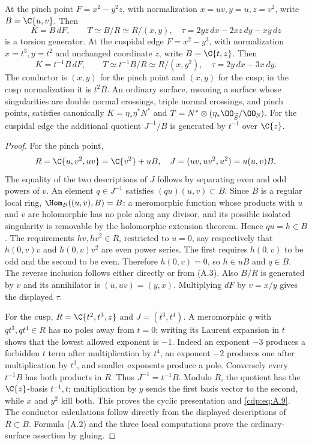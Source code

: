 
\begin{proposition}\label{cdp:st:A.2.4}
At the pinch point $F=x^2-y^2z$, with normalization $x=uv,y=u,z=v^2$, write $B=\C\{u,v\}$. Then
\[
 K=B\,dF,\qquad T\simeq B/R\simeq R/(x,y),
\quad \tau=2yz\,dx-2xz\,dy-xy\,dz
\tag{A.8}\label{cdp:eq:A.8}
\]
is a torsion generator. At the cuspidal edge $F=x^2-y^3$, with normalization $x=t^3,y=t^2$ and unchanged coordinate $z$, write $B=\C\{t,z\}$. Then
\[
 K=t^{-1}B\,dF,\qquad
 T\simeq t^{-1}B/R\simeq R/(x,y^2),
 \quad\tau=2y\,dx-3x\,dy.
\tag{A.9}\label{cdp:eq:A.9}
\]
The conductor is $(x,y)$ for the pinch point and $(x,y)$ for the cusp; in the cusp normalization it is $t^2B$. An ordinary surface, meaning a surface whose singularities are double normal crossings, triple normal crossings, and pinch points, satisfies canonically $K=\eta_*\eta^*N^*$ and $T=N^*\otimes(\eta_*\OO_{\widetilde S}/\OO_S)$. For the cuspidal edge the additional quotient $J^{-1}/B$ is generated by $t^{-1}$ over $\C\{z\}$.
\end{proposition}
\begin{proof}
For the pinch point,
\[
 R=\C\{u,v^2,uv\}=\C\{v^2\}+uB,
 \quad J=(uv,uv^2,u^2)=u(u,v)B.
\]
The equality of the two descriptions of $J$ follows by separating even and odd powers of $v$. An element $q\in J^{-1}$ satisfies $(qu)(u,v)\subset B$. Since $B$ is a regular local ring, $\Hom_B((u,v),B)=B$: a meromorphic function whose products with $u$ and $v$ are holomorphic has no pole along any divisor, and its possible isolated singularity is removable by the holomorphic extension theorem. Hence $qu=h\in B$. The requirements $hv,hv^2\in R$, restricted to $u=0$, say respectively that $h(0,v)v$ and $h(0,v)v^2$ are even power series. The first requires $h(0,v)$ to be odd and the second to be even. Therefore $h(0,v)=0$, so $h\in uB$ and $q\in B$. The reverse inclusion follows either directly or from (A.3). Also $B/R$ is generated by $v$ and its annihilator is $(u,uv)=(y,x)$. Multiplying $dF$ by $v=x/y$ gives the displayed $\tau$.

For the cusp, $R=\C\{t^2,t^3,z\}$ and $J=(t^3,t^4)$. A meromorphic $q$ with $qt^3,qt^4\in R$ has no poles away from $t=0$; writing its Laurent expansion in $t$ shows that the lowest allowed exponent is $-1$. Indeed an exponent $-3$ produces a forbidden $t$ term after multiplication by $t^4$, an exponent $-2$ produces one after multiplication by $t^3$, and smaller exponents produce a pole. Conversely every $t^{-1}B$ has both products in $R$. Thus $J^{-1}=t^{-1}B$. Modulo $R$, the quotient has the $\C\{z\}$-basis $t^{-1},t$; multiplication by $y$ sends the first basis vector to the second, while $x$ and $y^2$ kill both. This proves the cyclic presentation and \eqref{cdp:eq:A.9}. The conductor calculations follow directly from the displayed descriptions of $R\subset B$. Formula (A.2) and the three local computations prove the ordinary-surface assertion by gluing.
\end{proof}


